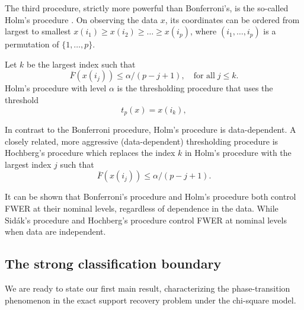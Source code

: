 The third procedure, strictly more powerful than Bonferroni's, is the so-called Holm's procedure \citep{holm1979simple}.
On observing the data $x$, its coordinates can be ordered from largest to smallest
$x(i_1) \ge x(i_2)  \ge \ldots \ge x(i_p)$,
where $(i_1, \ldots, i_p)$ is a permutation of $\{1, \ldots, p\}$. 
\begin{definition}
Let $k$ be the largest index such that
$$
\overline{F}(x(i_j)) \le \alpha / (p-j+1),\quad \text{for all}\;j\le k.
$$
Holm's procedure with level $\alpha$ is the thresholding procedure that uses the threshold
\begin{equation} \label{eq:Holm-procedure}
    t_p(x) = x(i_{k}),
\end{equation}
\end{definition}
In contrast to the Bonferroni procedure, Holm's procedure is data-dependent.
A closely related, more aggressive (data-dependent) thresholding procedure is Hochberg's procedure \citep{hochberg1988sharper}
which replaces the index $k$ in Holm's procedure with the largest index $j$ such that
$$
\overline{F}(x(i_j)) \le \alpha / (p-j+1).
$$

It can be shown that Bonferroni's procedure and Holm's procedure both control FWER at their nominal levels, regardless of dependence in the data.
While Sid\'ak's procedure and Hochberg's procedure control FWER at nominal levels when data are independent.

\subsection{The strong classification boundary}
\label{subsec:strong-classification-boundary}

We are ready to state our first main result, characterizing the phase-transition phenomenon in the exact support recovery problem under the chi-square model.

